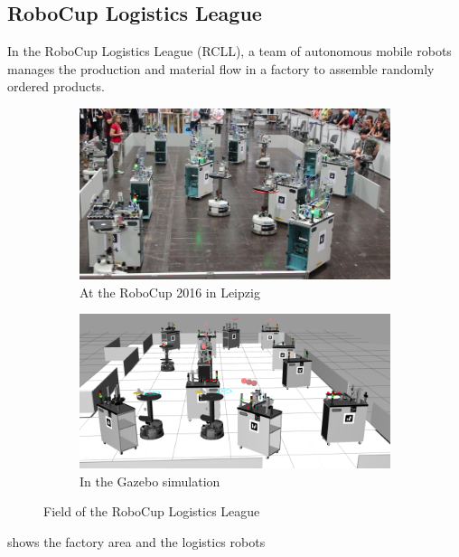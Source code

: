 \subsection{RoboCup Logistics League}
\label{sec:app-rcll}
In the RoboCup Logistics League (RCLL), a team of autonomous mobile
robots manages the production and material flow in a factory to
assemble randomly ordered products.
\begin{figure}
  \centering
  \begin{subfigure}[b]{0.49\textwidth}
    \includegraphics[width=\textwidth]{img/rcll-field}
    \caption{At the RoboCup 2016 in Leipzig}
    \label{fig:rcll-real}
  \end{subfigure}
\hfill
  \begin{subfigure}[b]{0.49\textwidth}
    \includegraphics[width=\textwidth,height=0.55\textwidth]{img/rcll-sim}
    \caption{In the Gazebo simulation}
    \label{fig:rcll-sim}
  \end{subfigure}
  \caption[Field of the RoboCup Logistics League]{Field of the RoboCup Logistics League}
  \label{fig:rcll}
\end{figure}
 shows the factory area and the logistics robots
